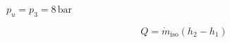 

\item[c)] \( p_u = p_3 = 8 \, \text{bar} \)
    
    \[
    Q = \dot{m}_{\text{iso}} (h_2 - h_1)
    \]